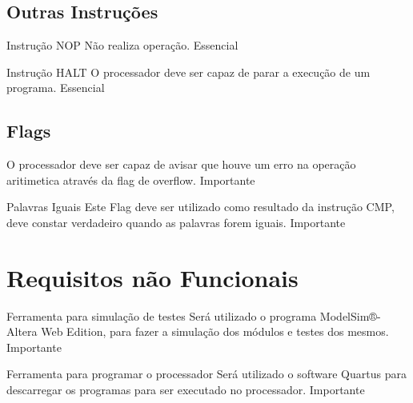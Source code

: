 \documentclass{article}
\begin{document}
    \subsection{Outras Instruções}
  
    \begin{functional}     

      \requirement
      {Instrução NOP}
      {Não realiza operação.}
      {Essencial}
      
      \requirement
      {Instrução HALT}
      {O processador deve ser capaz de parar a execução de um programa.}
      {Essencial}

    \end{functional}
    
    \subsection{Flags}
    
    \begin{functional}
    
      {O processador deve ser capaz de avisar que houve um erro na operação aritimetica através da flag de overflow.}
      {Importante}
      
      \requirement
      {Palavras Iguais}
      {Este Flag deve ser utilizado como resultado da instrução CMP, deve constar verdadeiro quando as palavras forem iguais.}
      {Importante}
    
     \end{functional}
 
\section{Requisitos não Funcionais}

  \begin{nonfunctional}
    
    \requirement
    {Ferramenta para simulação de testes}
    {Será utilizado o programa ModelSim®-Altera Web Edition, para fazer a simulação dos módulos e testes dos mesmos.}
    {Importante}   
    
    \requirement
    {Ferramenta para programar o processador}
    {Será utilizado o software Quartus para descarregar os programas para ser executado no processador.}
    {Importante}
    
  \end{nonfunctional}
\end{document}
